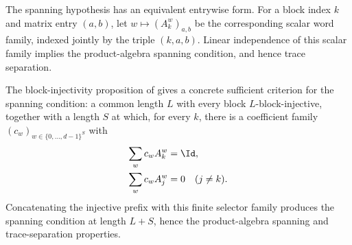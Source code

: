\begin{remark}
    The spanning hypothesis has an equivalent entrywise form. For a block
    index $k$ and matrix entry $(a,b)$, let
    $w\longmapsto(A_k^w)_{a,b}$
    be the corresponding scalar word family, indexed jointly by the triple
    $(k,a,b)$. Linear independence of this scalar family implies the
    product-algebra spanning condition, and hence trace separation.

    The block-injectivity proposition of
    \cite[lines~340--345]{Cirac2016MPDO_arXiv} gives a concrete sufficient
    criterion for the spanning condition: a common length $L$ with every
    block $L$-block-injective, together with a length $S$ at which, for
    every $k$, there is a coefficient family
    $(c_w)_{w\in\{0,\ldots,d{-}1\}^S}$ with
    \begin{align}
        \sum_w c_w A_k^w
         & =\Id,
        \notag   \\
        \sum_w c_w A_j^w
         & =0
        \quad(j\neq k).
        \notag
    \end{align}
    Concatenating the injective prefix with this finite selector family
    produces the spanning condition at length $L+S$, hence the product-algebra
    spanning and trace-separation properties.
\end{remark}

